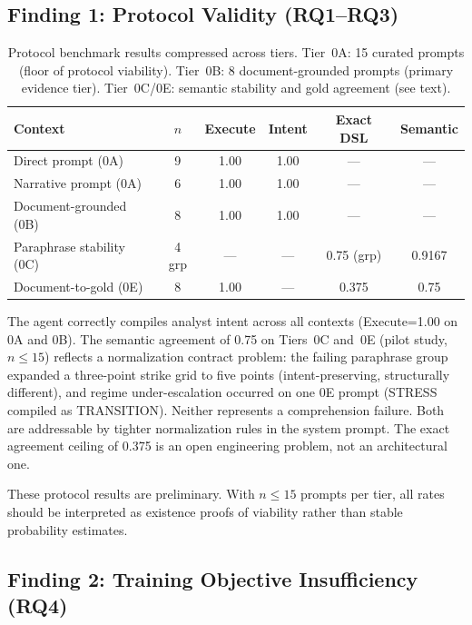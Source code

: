 \documentclass[11pt,a4paper]{article}
\begin{document}
\subsection{Finding 1: Protocol Validity (RQ1--RQ3)}
\label{sec:experiments:protocol}

\begin{table}[ht]
\centering
\caption{Protocol benchmark results compressed across tiers. Tier~0A: 15 curated
prompts (floor of protocol viability). Tier~0B: 8 document-grounded prompts (primary
evidence tier). Tier~0C/0E: semantic stability and gold agreement (see text).}
\begin{tabular}{@{}lccccc@{}}
\toprule
Context & $n$ & Execute & Intent & Exact DSL & Semantic \\ \midrule
Direct prompt (0A) & 9 & 1.00 & 1.00 & --- & --- \\
Narrative prompt (0A) & 6 & 1.00 & 1.00 & --- & --- \\
Document-grounded (0B) & 8 & 1.00 & 1.00 & --- & --- \\
Paraphrase stability (0C) & 4 grp & --- & --- & 0.75 (grp) & 0.9167 \\
Document-to-gold (0E) & 8 & 1.00 & --- & 0.375 & 0.75 \\ \bottomrule
\end{tabular}
\label{tab:protocol}
\end{table}

The agent correctly compiles analyst intent across all contexts (Execute=1.00 on 0A
and 0B). The semantic agreement of 0.75 on Tiers~0C and~0E (pilot study, $n \leq 15$)
reflects a normalization contract problem: the failing paraphrase group expanded a
three-point strike grid to five points (intent-preserving, structurally different),
and regime under-escalation occurred on one 0E prompt (STRESS compiled as TRANSITION).
Neither represents a comprehension failure. Both are addressable by tighter
normalization rules in the system prompt. The exact agreement ceiling of 0.375 is an
open engineering problem, not an architectural one.

These protocol results are preliminary. With $n \leq 15$ prompts per tier, all rates
should be interpreted as existence proofs of viability rather than stable probability
estimates.

\subsection{Finding 2: Training Objective Insufficiency (RQ4)}
\label{sec:experiments:monotonicity}
\end{document}
